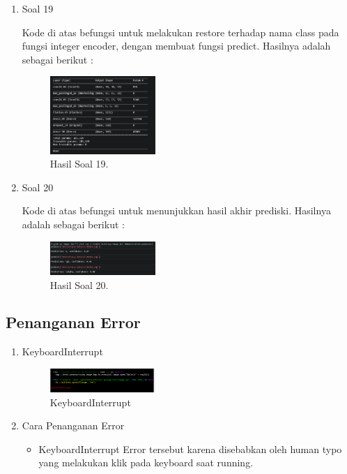 \begin{enumerate}
	\item Soal 19
	\hfill\break
	
	Kode di atas befungsi untuk melakukan restore terhadap nama class pada fungsi integer encoder, dengan membuat fungsi predict. Hasilnya adalah sebagai berikut :  
	\begin{figure}[H]
	\centering
		\includegraphics[width=4cm]{figures/1174073/tugas7/materi/hasil19.PNG}
		\caption{Hasil Soal 19.}
	\end{figure}

	\item Soal 20
	\hfill\break
	
	Kode di atas befungsi untuk menunjukkan hasil akhir prediski. Hasilnya adalah sebagai berikut :  
	\begin{figure}[H]
	\centering
		\includegraphics[width=4cm]{figures/1174073/tugas7/materi/hasil20.PNG}
		\caption{Hasil Soal 20.}
	\end{figure}
\end{enumerate}

\subsection{Penanganan Error}
\begin{enumerate}
	\item KeyboardInterrupt
	\begin{figure}[H]
		\includegraphics[width=4cm]{figures/1174073/tugas7/error/1.PNG}
		\centering
		\caption{KeyboardInterrupt}
	\end{figure}

	\item Cara Penanganan Error
	\begin{itemize}
		\item KeyboardInterrupt
		\hfill\break
		Error tersebut karena disebabkan oleh human typo yang melakukan klik pada keyboard saat running.
	\end{itemize}
\end{enumerate}

